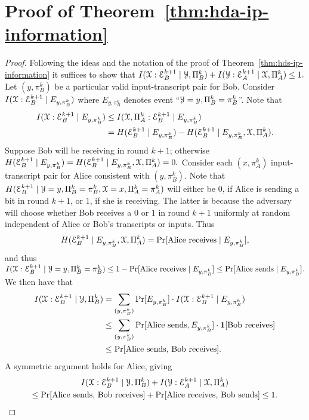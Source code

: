 \section{Proof of Theorem~\ref{thm:hda-ip-information}}
\begin{proof}
	Following the ideas and the notation of the proof of Theorem~\ref{thm:hds-ip-information}
	it suffices to show that $I(\mathcal{X}:\mathcal{E}^{k+1}_B\mid\mathcal{Y},\Pi^k_B)+I(\mathcal{Y}:\mathcal{E}^{k+1}_A\mid\mathcal{X},\Pi^k_A)\leq 1.$
	Let $(y,\pi^k_B)$ be a particular valid input-transcript pair for Bob.
	Consider $I(\mathcal{X}:\mathcal{E}^{k+1}_B\mid E_{y,\pi^k_B})$ where $E_{y,\pi^k_B}$ denotes event
	``$\mathcal{Y}=y,\Pi^k_B=\pi^k_B$''. Note that 
	\begin{align*}
	I(\mathcal{X}:\mathcal{E}^{k+1}_B\mid E_{y,\pi^k_B}) &\leq I(\mathcal{X},\Pi^k_A:\mathcal{E}^{k+1}_B\mid E_{y,\pi^k_B}) \\
	&= H(\mathcal{E}^{k+1}_B\mid E_{y,\pi^k_B})-H(\mathcal{E}^{k+1}_B\mid E_{y,\pi^k_B},\mathcal{X},\Pi^k_A).
	\end{align*}
	Suppose Bob will be receiving in round $k+1$; otherwise 
	$
	H(\mathcal{E}^{k+1}_B\mid E_{y,\pi^k_B}) = H(\mathcal{E}^{k+1}_B\mid E_{y,\pi^k_B},\mathcal{X},\Pi^k_A)=0.
	$
	Consider each $(x,\pi^k_A)$ input-transcript pair for Alice consistent with $(y,\pi^k_B)$.
	Note that $H(\mathcal{E}^{k+1}_B\mid\mathcal{Y}=y,\Pi^k_B=\pi^k_B,\mathcal{X}=x,\Pi^k_A=\pi^k_A)$ will either be $0$, if Alice is sending a bit in round $k+1$, or $1$, if she is receiving.
	The latter is because the adversary will choose whether Bob receives a $0$ or $1$ in round $k+1$ uniformly at random independent of Alice or Bob's transcripts or inputs.
	Thus 
	\[
	H(\mathcal{E}^{k+1}_B\mid E_{y,\pi^k_B},\mathcal{X},\Pi^k_A)=\Pr[\textrm{Alice receives}\mid E_{y,\pi^k_B}],
	\]
	and thus 
	$
	I(\mathcal{X}:\mathcal{E}^{k+1}_B\mid\mathcal{Y}=y,\Pi^k_B=\pi^k_B)\leq 1-\Pr[\textrm{Alice receives}\mid E_{y,\pi^k_B}]
	\leq\Pr[\textrm{Alice sends}\mid E_{y,\pi^k_B}].
	$
	We then have that \begin{align*}
	I(\mathcal{X}:\mathcal{E}^{k+1}_B\mid\mathcal{Y},\Pi^k_B)
	&=\sum_{(y,\pi^k_B)}\Pr[E_{y,\pi^k_B}]\cdot I(\mathcal{X}:\mathcal{E}^{k+1}_B\mid E_{y,\pi^k_B})\\
	&\leq \sum_{(y,\pi^k_B)}\Pr[\textrm{Alice sends}, E_{y,\pi^k_B}]\cdot\mathbf{1}[\textrm{Bob receives}]\\
	&\leq \Pr[\textrm{Alice sends, Bob receives}].
	\end{align*}
	A symmetric argument holds for Alice, giving 
	\begin{multline*}
	I(\mathcal{X}:\mathcal{E}^{k+1}_B\mid\mathcal{Y},\Pi^k_B)+I(\mathcal{Y}:\mathcal{E}^{k+1}_A\mid\mathcal{X},\Pi^k_A)\\
	\leq \Pr[\textrm{Alice sends, Bob receives}] + \Pr[\textrm{Alice receives, Bob sends}]\leq 1.
	\end{multline*}
\end{proof}

